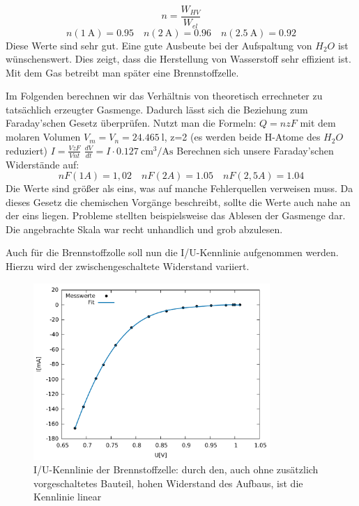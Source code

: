 \[ n=\frac{W_{HV}}{W_{el}} \]
\[
n(\SI{1}{\ampere})=0.95 \quad
n(\SI{2}{\ampere})=0.96 \quad
n(\SI{2,5}{\ampere})=0.92
\]
Diese Werte sind sehr gut. Eine gute Ausbeute bei der Aufspaltung von $H_2O$ ist wünschenswert.
Dies zeigt, dass die Herstellung von Wasserstoff sehr effizient ist. Mit dem Gas betreibt man später eine Brennstoffzelle.

Im Folgenden berechnen wir das Verhältnis von theoretisch errechneter zu tatsächlich erzeugter Gasmenge.
Dadurch lässt sich die Beziehung zum Faraday’schen Gesetz überprüfen. Nutzt man die Formeln:
$Q=nzF$
mit dem molaren Volumen $V_m=V_n=\SI{24,465}{\litre}$,
z=2 (es werden beide H-Atome des $H_2O$ reduziert)
$I=\frac{VzF}{Vnt}$
$\frac{dV}{dt}=I \cdot \SI{0.127}{\centi \meter \cubed \per \ampere \second}$
Berechnen sich unsere Faraday’schen Widerstände auf:
\[
nF(1A)=1,02 \quad nF(2A) = 1.05 \quad nF(2,5A)=1.04
\]
Die Werte sind größer als eins, was auf manche Fehlerquellen verweisen muss. Da dieses Gesetz die chemischen Vorgänge beschreibt, sollte die Werte auch nahe an der eins liegen.
Probleme stellten beispielsweise das Ablesen der Gasmenge dar.
Die angebrachte Skala war recht unhandlich und grob abzulesen.

Auch für die Brennstoffzolle soll nun die I/U-Kennlinie aufgenommen werden. Hierzu wird der zwischengeschaltete Widerstand variiert.
\begin{figure}
	\centering
	\includegraphics[width=0.8\textwidth]{mess/aufg10.pdf}
	\caption{I/U-Kennlinie der Brennstoffzelle: durch den, auch ohne zusätzlich vorgeschaltetes Bauteil, hohen Widerstand des Aufbaus, ist die Kennlinie linear}
	\label{a10}
\end{figure}


